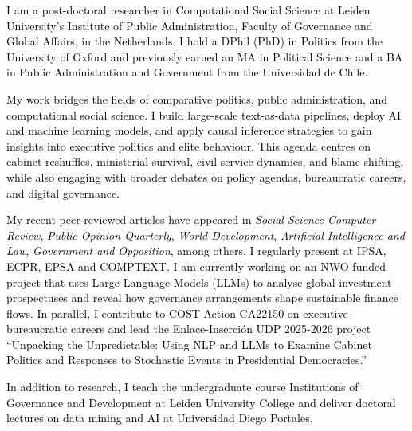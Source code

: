 




\vspace{3mm}

\begin{cvparagraph}

\textcolor{black}{I am a post-doctoral researcher in Computational Social Science at Leiden University’s Institute of Public Administration, Faculty of Governance and Global Affairs, in the Netherlands. I hold a DPhil (PhD) in Politics from the University of Oxford and previously earned an MA in Political Science and a BA in Public Administration and Government from the Universidad de Chile.}

\textcolor{black}{My work bridges the fields of comparative politics, public administration, and computational social science. I build large-scale text-as-data pipelines, deploy AI and machine learning models, and apply causal inference strategies to gain insights into executive politics and elite behaviour. This agenda centres on cabinet reshuffles, ministerial survival, civil service dynamics, and blame-shifting, while also engaging with broader debates on policy agendas, bureaucratic careers, and digital governance.}

\textcolor{black}{My recent peer-reviewed articles have appeared in {\itshape Social Science Computer Review}, {\itshape Public Opinion Quarterly}, {\itshape World Development}, {\itshape Artificial Intelligence and Law}, {\itshape Government and Opposition}, among others. I regularly present at IPSA, ECPR, EPSA and COMPTEXT. I am currently working on an NWO-funded project that uses Large Language Models (LLMs) to analyse global investment prospectuses and reveal how governance arrangements shape sustainable finance flows. In parallel, I contribute to COST Action CA22150 on executive-bureaucratic careers and lead the Enlace-Inserción UDP 2025-2026 project “Unpacking the Unpredictable: Using NLP and LLMs to Examine Cabinet Politics and Responses to Stochastic Events in Presidential Democracies.”}

\textcolor{black}{In addition to research, I teach the undergraduate course Institutions of Governance and Development at Leiden University College and deliver doctoral lectures on data mining and AI at Universidad Diego Portales.}
\vspace{1mm}
\end{cvparagraph}
